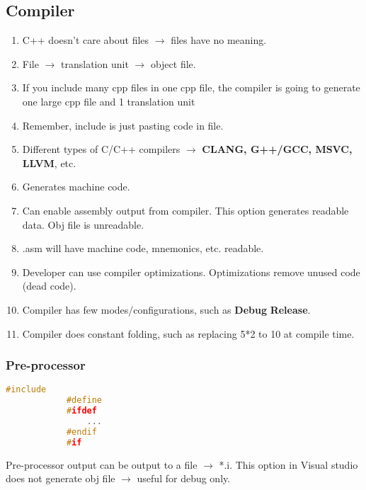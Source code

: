 \documentclass{article}
\begin{document}
    \subsection{Compiler}
        \begin{enumerate}
            \item C++ doesn’t care about files $\rightarrow$ files have no meaning. 
            \item File $\rightarrow$ translation unit $\rightarrow$ object file.
            \item If you include many cpp files in one cpp file, the compiler is going to generate one large cpp file and 1 translation unit
            \item Remember, include is just pasting code in file. 
            \item Different types of C/C++ compilers $\rightarrow$ \textbf{CLANG, G++/GCC, MSVC, LLVM}, etc.
            \item Generates machine code.
            \item Can enable assembly output from compiler. This option generates readable data. Obj file is unreadable.
            \item .asm will have machine code, mnemonics, etc. readable.
            \item Developer can use compiler optimizations. Optimizations remove unused code (dead code).
            \item Compiler has few modes/configurations, such as \textbf{Debug} \textbf{Release}. 
            \item Compiler does constant folding, such as replacing 5*2 to 10 at compile time.
        \end{enumerate}
        
        \subsubsection{Pre-processor}
            \begin{lstlisting}[language=C++]
            #include
            #define
            #ifdef
                ...
            #endif 
            #if
            \end{lstlisting}
        
            Pre-processor output can be output to a file $\rightarrow$ *.i. This option in Visual studio does not generate obj file $\rightarrow$ useful for debug only.
        
\end{document}
